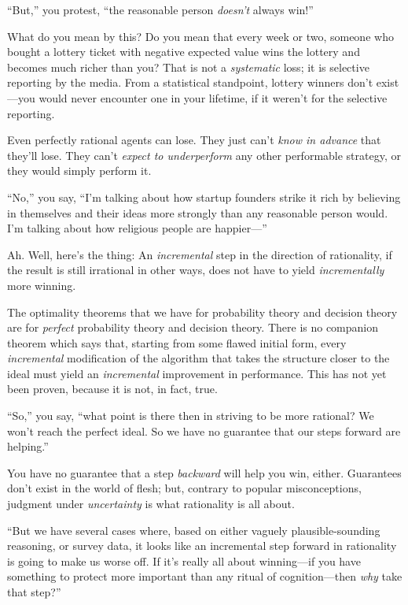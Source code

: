 {
 ``But,'' you protest,
``the reasonable person
\textit{doesn't} always win!''}

{
 What do you mean by this? Do you mean that every week or two,
someone who bought a lottery ticket with negative expected value wins
the lottery and becomes much richer than you? That is not a
\textit{systematic} loss; it is selective reporting by the media. From
a statistical standpoint, lottery winners don't
exist---you would never encounter one in your lifetime, if it
weren't for the selective reporting.}

{
 Even perfectly rational agents can lose. They just
can't \textit{know in advance} that
they'll lose. They can't \textit{expect
to underperform} any other performable strategy, or they would simply
perform it.}

{
 ``No,'' you say,
``I'm talking about how startup
founders strike it rich by believing in themselves and their ideas more
strongly than any reasonable person would. I'm talking
about how religious people are happier---''}

{
 Ah. Well, here's the thing: An
\textit{incremental} step in the direction of rationality, if the
result is still irrational in other ways, does not have to yield
\textit{incrementally} more winning.}

{
 The optimality theorems that we have for probability theory and
decision theory are for \textit{perfect} probability theory and
decision theory. There is no companion theorem which says that,
starting from some flawed initial form, every \textit{incremental}
modification of the algorithm that takes the structure closer to the
ideal must yield an \textit{incremental} improvement in performance.
This has not yet been proven, because it is not, in fact, true.}

{
 ``So,'' you say,
``what point is there then in striving to be more
rational? We won't reach the perfect ideal. So we have
no guarantee that our steps forward are helping.''}

{
 You have no guarantee that a step \textit{backward} will help you
win, either. Guarantees don't exist in the world of
flesh; but, contrary to popular misconceptions, judgment under
\textit{uncertainty} is what rationality is all about.}

{
 ``But we have several cases where, based on
either vaguely plausible-sounding reasoning, or survey data, it looks
like an incremental step forward in rationality is going to make us
worse off. If it's really all about winning---if you
have something to protect more important than any ritual of
cognition---then \textit{why} take that step?''}

